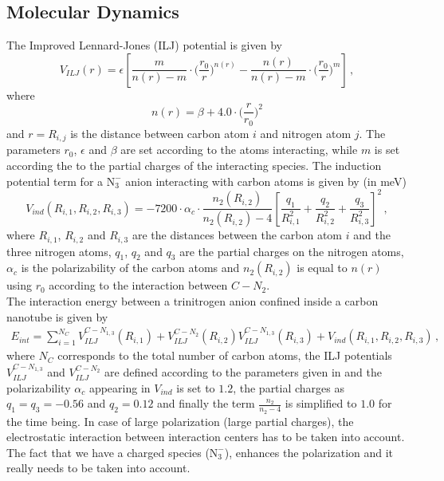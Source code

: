 \documentclass[utf8]{article}
\begin{document}
\subsection{Molecular Dynamics}
The Improved Lennard-Jones (ILJ) potential is given by
%
\begin{equation}
    V_{ILJ}(r) = \epsilon \left[ \frac{m}{n(r)-m} \cdot \Big( \frac{r_0}{r} \Big)^{n(r)} -
                                 \frac{n(r)}{n(r)-m} \cdot \Big( \frac{r_0}{r} \Big)^{m} \right] \, ,
\end{equation}
%
where
%
\begin{equation}
    n(r) = \beta + 4.0 \cdot \Big( \frac{r}{r_0} \Big)^2
\end{equation}
%
and $r = R_{i,j}$ is the distance between carbon atom $i$ and nitrogen atom $j$. The parameters $r_0$, $\epsilon$ and $\beta$ are set according to the atoms interacting, while $m$ is set according the to the partial charges of the interacting species.
The induction potential term for a $\text{N}_3^-$ anion interacting with carbon atoms is given by (in meV)
%
\begin{equation}
    V_{ind}(R_{i,1},R_{i,2},R_{i,3}) = - 7200 \cdot \alpha_c \cdot \frac{n_2(R_{i,2})}{n_2(R_{i,2}) - 4}
                        \left[ \frac{q_1}{R_{i,1}^2} + \frac{q_2}{R_{i,2}^2} + \frac{q_3}{R_{i,3}^2} \right]^2 \, ,
\end{equation}
%
where $R_{i,1}$, $R_{i,2}$ and $R_{i,3}$ are the distances between the carbon atom $i$ and the three nitrogen atoms, $q_1$, $q_2$ and $q_3$ are the partial charges on the nitrogen atoms, $\alpha_c$ is the polarizability of the carbon atoms and $n_2(R_{i,2})$ is equal to $n(r)$ using $r_0$ according to the interaction between $C-N_2$.\\
The interaction energy between a trinitrogen anion confined inside a carbon nanotube is given by
%
\begin{align}
    E_{int} = \sum_{i=1}^{N_C} V_{ILJ}^{C-N_{1,3}}(R_{i,1}) + V_{ILJ}^{C-N_{2}}(R_{i,2}) V_{ILJ}^{C-N_{1,3}}(R_{i,3}) + V_{ind}(R_{i,1},R_{i,2},R_{i,3}) \, ,
\end{align}
%
where $N_C$ corresponds to the total number of carbon atoms, the ILJ potentials $V_{ILJ}^{C-N_{1,3}}$ and $V_{ILJ}^{C-N_{2}}$ are defined according to the parameters given in  and the polarizability $\alpha_c$ appearing in $V_{ind}$ is set to $1.2$, the partial charges as $q_1 = q_3 = -0.56$ and $q_2 = 0.12$ and finally the term $\tfrac{n_2}{n_2 - 4}$ is simplified to $1.0$ for the time being.
%
In case of large polarization (large partial charges), the electrostatic interaction between interaction centers has to be taken into account. The fact that we have a charged species ($\text{N}_3^-$), enhances the polarization and it really needs to be taken into account.\\
\end{document}
